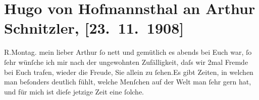 

         
         \renewcommand{\erwaehntePersonen}{Personen: Hugo von Hofmannsthal, Gustav Seidler, Alfred von Winterstein}
         \renewcommand{\erwaehnteOrte}{Orte: Rodaun, Wien}
         \renewcommand{\erwaehnteWerke}{Werke: Der Weg ins Freie. Roman, [Gedichte]}
               \section[Hugo von Hofmannsthal an Arthur Schnitzler, {[}23. 11. 1908{]}]{ Hugo von Hofmannsthal an Arthur Schnitzler, {[}23. 11. 1908{]}}\nopagebreak{}\rehead{ }\begin{ledgroupsized}[t]{13cm}\normalsize\beginnumbering{} \toendnotes[C]{\smallbreak\pagebreak[2]} 
\toendnotes[C]{\smallbreak}\pstart
           \raggedleft{}{\pb}R.Montag.\pend
           \pstart{}mein lieber Arthur\pend\pstart
           ſo nett und gemütlich es \label{K_L01808-1v}\label{K_L01808-1h} abends bei Euch war, ſo ſehr wünſche ich mir nach der ungewohnten
               Zufälligkeit, daſs wir \introOben{}2mal\introOben{} Fremde bei Euch trafen, wieder
               die Freude, Sie allein zu ſehen.\hspace*{1.5em}Es gibt Zeiten, in
               welchen man beſonders deutlich fühlt, welche Menſchen {\pb}auf der Welt man ſehr gern hat,
               und für mich ist dieſe jetzige Zeit eine ſolche.\pend

\end{ledgroupsized}
